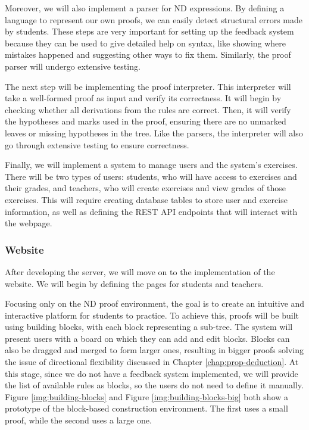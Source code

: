 Moreover, we will also implement a parser for \gls{ND} expressions. By defining a language to represent our own proofs, we can easily detect structural errors made by students. These steps are very important for setting up the feedback system because they can be used to give detailed help on syntax, like showing where mistakes happened and suggesting other ways to fix them. Similarly, the proof parser will undergo extensive testing.

The next step will be implementing the proof interpreter. This interpreter will take a well-formed proof as input and verify its correctness. It will begin by checking whether all derivations from the rules are correct. Then, it will verify the hypotheses and marks used in the proof, ensuring there are no unmarked leaves or missing hypotheses in the tree. Like the parsers, the interpreter will also go through extensive testing to ensure correctness.

Finally, we will implement a system to manage users and the system's exercises. There will be two types of users: students, who will have access to exercises and their grades, and teachers, who will create exercises and view grades of those exercises. This will require creating database tables to store user and exercise information, as well as defining the REST API endpoints that will interact with the webpage.

\subsubsection{Website}
After developing the server, we will move on to the implementation of the website. We will begin by defining the pages for students and teachers. 

Focusing only on the \gls{ND} proof environment, the goal is to create an intuitive and interactive platform for students to practice. To achieve this, proofs will be built using building blocks, with each block representing a sub-tree. The system will present users with a board on which they can add and edit blocks. Blocks can also be dragged and merged to form larger ones, resulting in bigger proofs solving the issue of directional flexibility discussed in Chapter \ref{chap:prop-deduction}. At this stage, since we do not have a feedback system implemented, we will provide the list of available rules as blocks, so the users do not need to define it manually. Figure \ref{img:building-blocks} and Figure \ref{img:building-blocks-big} both show a prototype of the block-based construction environment. The first uses a small proof, while the second uses a large one.

